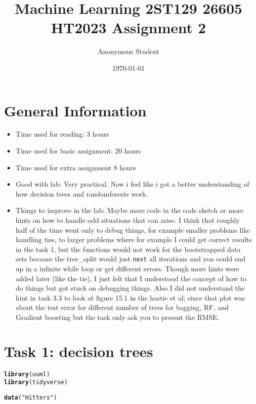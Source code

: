 \documentclass[10pt, a4paper, english]{article}\usepackage[]{graphicx}\usepackage[dvipsnames]{xcolor}
\title{Machine Learning 2ST129 26605 HT2023
 Assignment 2 }
\author{Anonymous Student}
\date{\today}
\makeatletter
\newcommand{\hlstr}[1]{\textcolor[rgb]{0.192,0.494,0.8}{#1}}%
\newcommand{\hlstd}[1]{\textcolor[rgb]{0.345,0.345,0.345}{#1}}%
\newcommand{\hlkwd}[1]{\textcolor[rgb]{0.737,0.353,0.396}{\textbf{#1}}}%
\newenvironment{kframe}{%
 \def\at@end@of@kframe{}%
 \ifinner\ifhmode%
  \def\at@end@of@kframe{\end{minipage}}%
  \begin{minipage}{\columnwidth}%
 \fi\fi%
 \def\FrameCommand##1{\hskip\@totalleftmargin \hskip-\fboxsep
 \colorbox{shadecolor}{##1}\hskip-\fboxsep
     \hskip-\linewidth \hskip-\@totalleftmargin \hskip\columnwidth}%
 \MakeFramed {\advance\hsize-\width
   \@totalleftmargin\z@ \linewidth\hsize
   \@setminipage}}%
 {\par\unskip\endMakeFramed%
 \at@end@of@kframe}
\newenvironment{knitrout}{}{} %
\makeatother
\begin{document}
\maketitle
\newpage
\tableofcontents
\newpage






\section*{General Information}
\begin{itemize}
\item Time used for reading: 3 hours
\item Time used for basic assignment: 20 hours
\item Time used for extra assignment 8 hours
\item Good with lab: Very practical. Now i feel like i got a better understanding of how decision trees and randomforests work.
\item Things to improve in the lab: Maybe more code in the code sketch or more hints on how to handle odd situations that can arise. 
I think that roughly half of the time went only to debug things, for example smaller problems like handling ties, to larger problems where for example I could get correct results in the task 1, but the functions would not work for the bootstrapped data sets because the tree\_split would just \texttt{next} all iterations and you could end up in a infinite while loop or get different errors.  Though more hints were added later (like the tie), I just felt that I understood the concept of how to do things but got stuck on debugging things. Also I did not understand the hint in task 3.3 to look at figure 15.1 in the hastie et al; since that plot was about the test error for different number of trees for bagging, RF, and Gradient boosting but the task only ask you to present the RMSE. 

\end{itemize}



\section{Task 1: decision trees}
\begin{knitrout}
\color{fgcolor}\begin{kframe}
\begin{alltt}
\hlkwd{library}\hlstd{(uuml)}
\hlkwd{library}\hlstd{(tidyverse)}

 \hlkwd{data}\hlstd{(}\hlstr{"Hitters"}\hlstd{)}
\end{alltt}
\end{kframe}
\end{knitrout}
\end{document}
